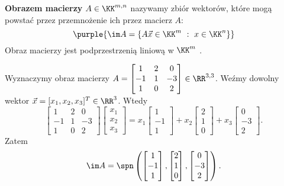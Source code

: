 \textbf{Obrazem macierzy} $A\in\KK^{m,n}$ nazywamy zbiór wektorów, które mogą powstać przez przemnożenie ich przez macierz $A$:
$$
\purple{\im A= \{A\vec{x}\in \KK^m \ : \ x \in \KK^n \}}
$$
Obraz macierzy jest podprzestrzenią liniową w $\KK^m$ .

\begin{example}
    Wyznaczymy obraz macierzy $A=\begin{bmatrix} 1 & 2 & 0 \\ -1 & 1 & -3 \\ 1 & 0 & 2 \end{bmatrix} \in \RR^{3,3}$. Weźmy dowolny wektor $\vec{x}=[x_1,x_2,x_3]^T\in\RR^3$. Wtedy
    $$
    \begin{bmatrix}
        1 & 2 & 0 \\
        -1 & 1 & -3 \\
        1 & 0 & 2 
    \end{bmatrix} \begin{bmatrix}
        x_1 \\ x_2 \\ x_3
    \end{bmatrix} = x_1 \begin{bmatrix}
        1 \\ -1 \\ 1
    \end{bmatrix} + x_2 \begin{bmatrix}
        2 \\ 1 \\ 0
    \end{bmatrix} + x_3 \begin{bmatrix}
        0 \\ -3 \\ 2
    \end{bmatrix}.
    $$
    Zatem
    $$
    \im A = \spn \left(
    \begin{bmatrix}
        1 \\ -1 \\ 1
    \end{bmatrix},
     \begin{bmatrix}
        2 \\ 1 \\ 0
    \end{bmatrix} ,
    \begin{bmatrix}
        0 \\ -3 \\ 2
    \end{bmatrix}
    \right).
    $$
\end{example}

